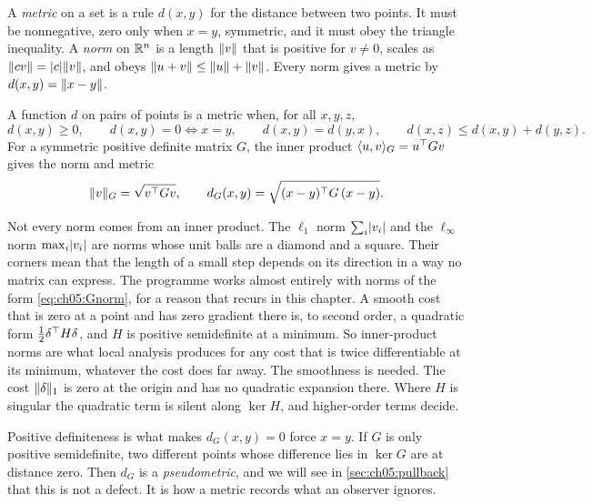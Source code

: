 A \emph{metric} on a set is a rule $d(x,y)$ for the distance between two points. It must be nonnegative, zero only when $x=y$, symmetric, and it must obey the triangle inequality. A \emph{norm} on $\mathbb{R}^n$ is a length $\lVert v\rVert$ that is positive for $v\ne 0$, scales as $\lVert cv\rVert=\lvert c\rvert\lVert v\rVert$, and obeys $\lVert u+v\rVert\le\lVert u\rVert+\lVert v\rVert$. Every norm gives a metric by $d(x,y)=\lVert x-y\rVert$.

\begin{definition}\label{def:ch05:metric}
A function $d$ on pairs of points is a metric when, for all $x,y,z$,
\begin{equation}\label{eq:ch05:metric-axioms}
d(x,y)\ge 0,\qquad d(x,y)=0\iff x=y,\qquad d(x,y)=d(y,x),\qquad d(x,z)\le d(x,y)+d(y,z).
\end{equation}
For a symmetric positive definite matrix $G$, the inner product $\langle u,v\rangle_G=u^{\top} G v$ gives the norm and metric
\begin{equation}\label{eq:ch05:Gnorm}
\lVert v\rVert_G=\sqrt{v^{\top} G v},\qquad d_G(x,y)=\sqrt{(x-y)^{\top} G\,(x-y)}.
\end{equation}
\end{definition}

Not every norm comes from an inner product. The $\ell_1$ norm $\sum_i\lvert v_i\rvert$ and the $\ell_\infty$ norm $\max_i\lvert v_i\rvert$ are norms whose unit balls are a diamond and a square. Their corners mean that the length of a small step depends on its direction in a way no matrix can express. The programme works almost entirely with norms of the form \eqref{eq:ch05:Gnorm}, for a reason that recurs in this chapter. A smooth cost that is zero at a point and has zero gradient there is, to second order, a quadratic form $\tfrac12\delta^{\top} H\delta$, and $H$ is positive semidefinite at a minimum. So inner-product norms are what local analysis produces for any cost that is twice differentiable at its minimum, whatever the cost does far away. The smoothness is needed. The cost $\lVert \delta\rVert_1$ is zero at the origin and has no quadratic expansion there. Where $H$ is singular the quadratic term is silent along $\ker H$, and higher-order terms decide.

Positive definiteness is what makes $d_G(x,y)=0$ force $x=y$. If $G$ is only positive semidefinite, two different points whose difference lies in $\ker G$ are at distance zero. Then $d_G$ is a \emph{pseudometric}, and we will see in \cref{sec:ch05:pullback} that this is not a defect. It is how a metric records what an observer ignores.

